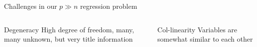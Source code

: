 \documentclass[
  ignorenonframetext,
  aspectratio=169]{beamer}
\begin{document}
\begin{frame}{Challenges in our \(p\gg n\) regression problem}
\protect\hypertarget{challenges-in-our-pgg-n-regression-problem}{}
\begin{columns}[T]
\begin{column}{.45\textwidth}
\begin{block}{Degeneracy}
\protect\hypertarget{degeneracy}{}
High degree of freedom, many, many unknown, but very title information
\end{block}

\scriptsize


\normalsize
\end{column}

\begin{column}{.45\textwidth}
\begin{block}{Col-linearity}
\protect\hypertarget{col-linearity}{}
Variables are somewhat similar to each other
\end{block}

\scriptsize

\end{column}
\end{columns}
\end{frame}
\end{document}
